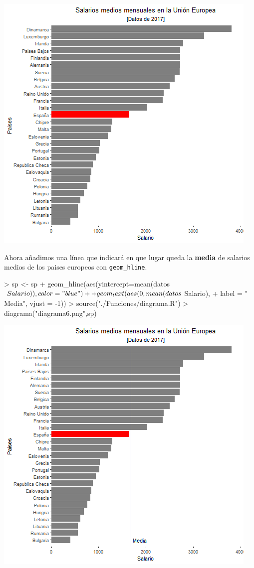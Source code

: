 \documentclass [a4paper] {article}
\begin{document}
\includegraphics[width=\textwidth]{diagrama5}

\bigskip
Ahora añadimos una línea que indicará en que lugar queda la \textbf{media} de salarios medios de los paises europeos con
\texttt{geom\_hline}.
\begin{Schunk}
\begin{Sinput}
> sp <- sp + geom_hline(aes(yintercept=mean(datos$Salario)),color = "blue") + 
+         geom_text(aes(0,mean(datos$Salario),
+         label = "            Media", vjust = -1))
> source("./Funciones/diagrama.R")
> diagrama("diagrama6.png",sp)
\end{Sinput}
\end{Schunk}

\includegraphics[width=\textwidth]{diagrama6}
\end{document}

